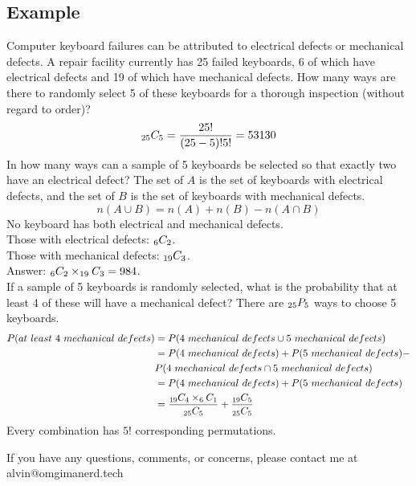 \documentclass[letterpaper, 12pt]{math}
\begin{document}
\subsection*{Example}
Computer keyboard failures can be attributed to electrical defects or
mechanical defects. A repair facility currently has 25 failed keyboards, 6
of which have electrical defects and 19 of which have mechanical defects.
How many ways are there to randomly select 5 of these keyboards for a thorough
inspection (without regard to order)?
\[ _{25}C_{5} = \frac{25!}{(25-5)!5!} = 53130 \]
In how many ways can a sample of 5 keyboards be selected so that exactly two
have an electrical defect? The set of \( A \) is the set of keyboards with
electrical defects, and the set of \( B \) is the set of keyboards with
mechanical defects.
\[ n(A \cup B) = n(A) + n(B) - n(A \cap B) \]
No keyboard has both electrical and mechanical defects. \\
Those with electrical defects: \( _{6}C_{2} \). \\
Those with mechanical defects: \( _{19}C_{3} \). \\
Answer: \( _{6}C_{2} \times _{19}C_{3} = 984 \). \\
If a sample of 5 keyboards is randomly selected, what is the probability that
at least 4 of these will have a mechanical defect? There are \( _{25}P_{5} \)
ways to choose 5 keyboards. \\
\begin{align*}
  P(at\ least\ 4\ mechanical\ defects) &=
    P(4\ mechanical\ defects \cup 5\ mechanical\ defects) \\
  &= P(4\ mechanical\ defects)+P(5\ mechanical\ defects)- \\
  & P(4\ mechanical\ defects \cap 5\ mechanical\ defects) \\
  &= P(4\ mechanical\ defects)+P(5\ mechanical\ defects) \\
  &= \frac{_{19}C_{4}\times_{6}C_{1}}{_{25}C_{5}}+
    \frac{_{19}C_{5}}{_{25}C_{5}}
\end{align*}
Every combination has \( 5! \) corresponding permutations.

\begin{center}
  If you have any questions, comments, or concerns, please contact me at
  alvin@omgimanerd.tech
\end{center}
\end{document}
